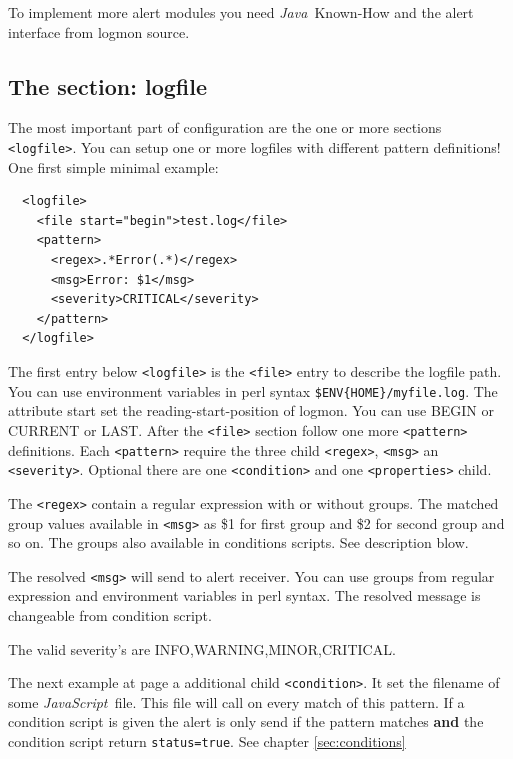 \documentclass[11pt,a4paper]{article}
\newcommand{\js}{\textit{JavaScript\ }}
\newcommand{\java}{\textit{Java\ }}
\begin{document}
To implement more alert modules you need \java Known-How and the alert interface
from logmon source.

\subsection{The section: logfile}

The most important part of configuration are the one or more sections \verb#<logfile>#. You can
setup one or more logfiles with different pattern definitions! One first simple minimal example:

\begin{samepage}
\label{ex:logfile1}
\begin{verbatim}
  <logfile>
    <file start="begin">test.log</file>
    <pattern>
      <regex>.*Error(.*)</regex>
      <msg>Error: $1</msg>
      <severity>CRITICAL</severity>
    </pattern>
  </logfile>
\end{verbatim}
\end{samepage}

The first entry below \verb#<logfile># is the \verb#<file># entry to describe
the logfile path. You can use environment variables in perl syntax
\verb#$ENV{HOME}/myfile.log#. The attribute start set the reading-start-position
of logmon. You can use BEGIN or CURRENT or LAST.
After the \verb#<file># section
follow one more \verb#<pattern># definitions. Each \verb#<pattern># require the
three child \verb#<regex>#, \verb#<msg># an \verb#<severity>#. Optional there
are one \verb#<condition># and one \verb#<properties># child.

The \verb#<regex># contain a regular expression with or without groups. The
matched group values available in \verb#<msg># as \$1 for first group and \$2
for second group and so on. The groups also available in conditions scripts. See
description blow.

The resolved \verb#<msg># will send to alert receiver. You can use groups from
regular expression and environment variables in perl syntax. The resolved message
is changeable from condition script.

The valid severity's are INFO,WARNING,MINOR,CRITICAL.

The next example at page \pageref{ex:logfile2} a additional child
\verb#<condition>#. It set the filename of some \js file. This file will
call on every match of this pattern. If a condition script is given the alert
is only send if the pattern matches \textbf{and} the condition script return
\verb#status=true#. See chapter \ref{sec:conditions}
\end{document}
